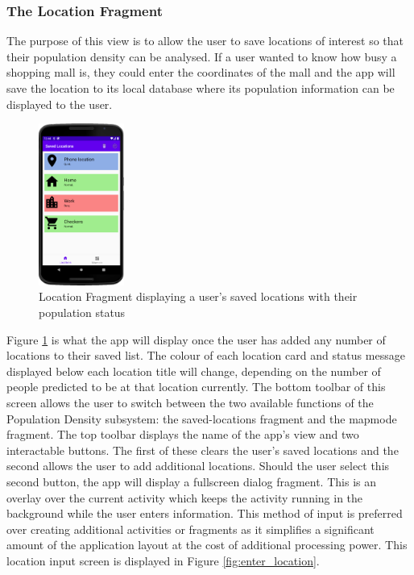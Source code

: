 \subsubsection{The Location Fragment}

The purpose of this view is to allow the user to save locations of interest so that their population density can be analysed. If a user wanted to know how busy a shopping mall is, they could enter the coordinates of the mall and the app will save the location to its local database where its population information can be displayed to the user. 

\begin{figure}[ht]
    \centering
    \includegraphics[width=0.25\textwidth]{figures/LocationFragmentDesign.PNG}
    \caption{Location Fragment displaying a user's saved locations with their population status}
    \label{fig:location_fragment_design}
\end{figure}

Figure \ref{fig:location_fragment_design} is what the app will display once the user has added any number of locations to their saved list. The colour of each location card and status message displayed below each location title will change, depending on the number of people predicted to be at that location currently. The bottom toolbar of this screen allows the user to switch between the two available functions of the Population Density subsystem: the saved-locations fragment and the mapmode fragment. The top toolbar displays the name of the app’s view and two interactable buttons. The first of these clears the user’s saved locations and the second allows the user to add additional locations. Should the user select this second button, the app will display a fullscreen dialog fragment. This is an overlay over the current activity which keeps the activity running in the background while the user enters information. This method of input is preferred over creating additional activities or fragments as it simplifies a significant amount of the application layout at the cost of additional processing power. This location input screen is displayed in Figure \ref{fig:enter_location}.

